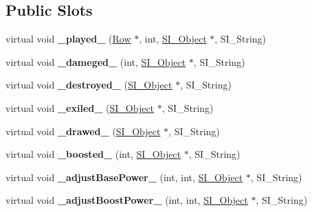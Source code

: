 \subsection*{Public Slots}
\begin{DoxyCompactItemize}
\item 
\mbox{\label{class_card_a75b65d674f42ab381ebd53c8c156e31d}} 
virtual void {\bfseries \+\_\+played\+\_\+} (\hyperlink{class_card_set}{Row} $\ast$, int, \hyperlink{class_s_i___object}{S\+I\+\_\+\+Object} $\ast$, S\+I\+\_\+\+String)
\item 
\mbox{\label{class_card_a353ffa2805c988fde980a67e6745a9bc}} 
virtual void {\bfseries \+\_\+dameged\+\_\+} (int, \hyperlink{class_s_i___object}{S\+I\+\_\+\+Object} $\ast$, S\+I\+\_\+\+String)
\item 
\mbox{\label{class_card_a8a98eab9a7a5a4c50a1e336751b709ed}} 
virtual void {\bfseries \+\_\+destroyed\+\_\+} (\hyperlink{class_s_i___object}{S\+I\+\_\+\+Object} $\ast$, S\+I\+\_\+\+String)
\item 
\mbox{\label{class_card_ac722ae5b2fe10cbbd61a7970a44a9b69}} 
virtual void {\bfseries \+\_\+exiled\+\_\+} (\hyperlink{class_s_i___object}{S\+I\+\_\+\+Object} $\ast$, S\+I\+\_\+\+String)
\item 
\mbox{\label{class_card_a4da0f5dd31f60daac0549aa69ade4ba0}} 
virtual void {\bfseries \+\_\+drawed\+\_\+} (\hyperlink{class_s_i___object}{S\+I\+\_\+\+Object} $\ast$, S\+I\+\_\+\+String)
\item 
\mbox{\label{class_card_a19a97de51f7a18f8204b86667960b78b}} 
virtual void {\bfseries \+\_\+boosted\+\_\+} (int, \hyperlink{class_s_i___object}{S\+I\+\_\+\+Object} $\ast$, S\+I\+\_\+\+String)
\item 
\mbox{\label{class_card_acbccbb53af9bb57aec878c6a089d976f}} 
virtual void {\bfseries \+\_\+adjust\+Base\+Power\+\_\+} (int, int, \hyperlink{class_s_i___object}{S\+I\+\_\+\+Object} $\ast$, S\+I\+\_\+\+String)
\item 
\mbox{\label{class_card_aa3038c21b3d53d2076654d37fcc585e5}} 
virtual void {\bfseries \+\_\+adjust\+Boost\+Power\+\_\+} (int, int, \hyperlink{class_s_i___object}{S\+I\+\_\+\+Object} $\ast$, S\+I\+\_\+\+String)

\end{DoxyCompactItemize}
